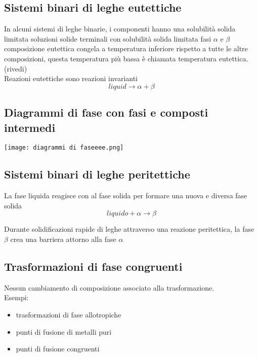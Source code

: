 \documentclass{article}
\begin{document}
\subsection{Sistemi binari di leghe eutettiche}
In alcuni sistemi di leghe binarie, i componenti hanno una solubilità solida limitata soluzioni solide terminali con solubilità solida limitata fasi $\alpha$ e $\beta$ composizione eutettica congela a temperatura inferiore rispetto a tutte le altre composizioni, questa temperatura più bassa è chiamata temperatura eutettica.  (rivedi)\\
Reazioni eutettiche sono reazioni invarianti
\begin{equation*}
    liquid \to \alpha + \beta
\end{equation*}

\subsection{Diagrammi di fase con fasi e composti intermedi}
\begin{center}
    \texttt{[image: diagrammi di faseeee.png]}
\end{center}

\subsection{Sistemi binari di leghe peritettiche}
La fase liquida reagisce con al fase solida per formare una nuova e diversa fase solida
\begin{equation*}
    liquido +\alpha \to \beta
\end{equation*}

Durante solidificazioni rapide di leghe attraverso una reazione peritettica, la fase $\beta$ crea una barriera attorno alla fase $\alpha$

\subsection{Trasformazioni di fase congruenti}
Nessun cambiamento di composizione associato alla trasformazione. \\
Esempi:
\begin{itemize}
    \item trasformazioni di fase allotropiche
    \item punti di fusione di metalli puri
    \item punti di fusione congruenti
\end{itemize}
\end{document}
